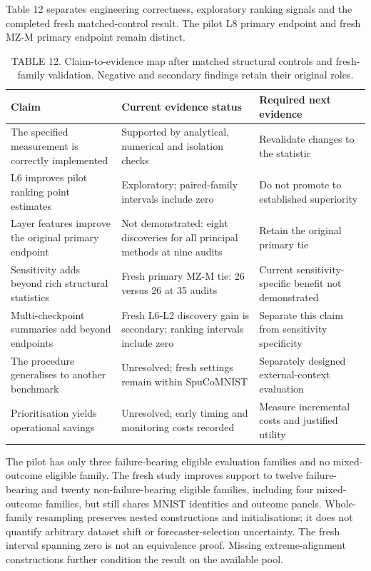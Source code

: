 Table 12 separates engineering correctness, exploratory ranking signals and the completed fresh matched-control result. The pilot L8 primary endpoint and fresh MZ-M primary endpoint remain distinct.

\begin{table}[t]
\caption{TABLE 12. Claim-to-evidence map after matched structural controls and fresh-family validation. Negative and secondary findings retain their original roles.}
\label{tab:claims}
\centering\small
\begin{tabular}{lll}
\toprule Claim & Current evidence status & Required next evidence\\\midrule
The specified measurement is correctly implemented & Supported by analytical, numerical and isolation checks & Revalidate changes to the statistic\\
L6 improves pilot ranking point estimates & Exploratory; paired-family intervals include zero & Do not promote to established superiority\\
Layer features improve the original primary endpoint & Not demonstrated: eight discoveries for all principal methods at nine audits & Retain the original primary tie\\
Sensitivity adds beyond rich structural statistics & Fresh primary MZ-M tie: 26 versus 26 at 35 audits & Current sensitivity-specific benefit not demonstrated\\
Multi-checkpoint summaries add beyond endpoints & Fresh L6-L2 discovery gain is secondary; ranking intervals include zero & Separate this claim from sensitivity specificity\\
The procedure generalises to another benchmark & Unresolved; fresh settings remain within SpuCoMNIST & Separately designed external-context evaluation\\
Prioritisation yields operational savings & Unresolved; early timing and monitoring costs recorded & Measure incremental costs and justified utility\\\bottomrule
\end{tabular}
\end{table}

The pilot has only three failure-bearing eligible evaluation families and no mixed-outcome eligible family. The fresh study improves support to twelve failure-bearing and twenty non-failure-bearing eligible families, including four mixed-outcome families, but still shares MNIST identities and outcome panels. Whole-family resampling preserves nested constructions and initialisations; it does not quantify arbitrary dataset shift or forecaster-selection uncertainty. The fresh interval spanning zero is not an equivalence proof. Missing extreme-alignment constructions further condition the result on the available pool.

